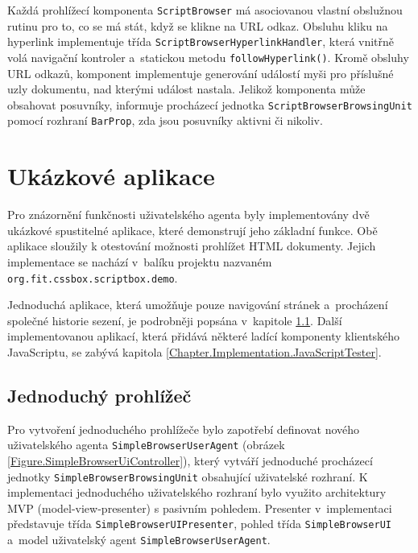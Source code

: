 Každá prohlížecí komponenta \texttt{ScriptBrowser} má asociovanou vlastní obslužnou rutinu pro to, co se má stát, když se klikne na URL odkaz. Obsluhu kliku na hyperlink implementuje třída \texttt{ScriptBrowserHyperlinkHandler}, která vnitřně volá navigační kontroler a~statickou metodu \texttt{followHyperlink()}. Kromě obsluhy URL odkazů, komponent implementuje generování událostí myši pro příslušné uzly dokumentu, nad kterými událost nastala. Jelikož komponenta může obsahovat posuvníky, informuje procházecí jednotka \texttt{ScriptBrowserBrowsingUnit} pomocí rozhraní \texttt{BarProp}, zda jsou posuvníky aktivni či nikoliv.

\section{Ukázkové aplikace}
\label{Chapter.Implementation.DemoApplications}

Pro znázornění funkčnosti uživatelského agenta byly implementovány dvě ukázkové spustitelné aplikace, které demonstrují jeho základní funkce. Obě aplikace sloužily k otestování možnosti prohlížet HTML dokumenty. Jejich implementace se nachází v~balíku projektu nazvaném \texttt{org.fit.cssbox.scriptbox.demo}.

Jednoduchá aplikace, která umožňuje pouze navigování stránek a~procházení společné historie sezení, je podrobněji popsána v~kapitole \ref{Chapter.Implementation.SimpleBrowser}. Další implementovanou aplikací, která přidává některé ladící komponenty klientského JavaScriptu, se zabývá kapitola \ref{Chapter.Implementation.JavaScriptTester}.  

\vspace{-0.5em}

\subsection{Jednoduchý prohlížeč}
\label{Chapter.Implementation.SimpleBrowser}

Pro vytvoření jednoduchého prohlížeče bylo zapotřebí definovat nového uživatelského agenta \texttt{SimpleBrowserUserAgent} (obrázek \ref{Figure.SimpleBrowserUiController}), který vytváří jednoduché procházecí jednotky \texttt{SimpleBrowserBrowsingUnit} obsahující uživatelské rozhraní. K implementaci jednoduchého uživatelského rozhraní bylo využito architektury MVP (model-view-presenter) s pasivním pohledem. Presenter v~implementaci představuje třída \texttt{SimpleBrowserUIPresenter}, pohled třída \texttt{SimpleBrowserUI} a~model uživatelský agent \texttt{SimpleBrowserUserAgent}.

